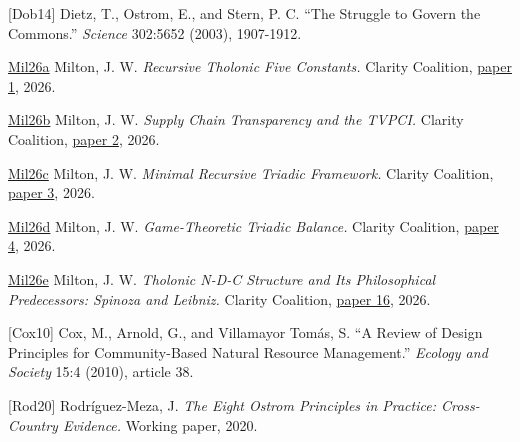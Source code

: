 \documentclass[
  11pt,
  letterpaper,
]{article}
\begin{document}
{[}Dob14{]} Dietz, T., Ostrom, E., and Stern, P. C. ``The Struggle to
Govern the Commons.'' \emph{Science} 302:5652 (2003), 1907-1912.

\href{https://github.com/baardev/truevalue/blob/main/docnav/Research/papers/1_recursive-tholonic-five-constants/1_recursive-tholonic-five-constants.pdf}{Mil26a}
Milton, J. W. \emph{Recursive Tholonic Five Constants.} Clarity
Coalition,
\href{https://github.com/baardev/truevalue/blob/main/docnav/Research/papers/1_recursive-tholonic-five-constants/1_recursive-tholonic-five-constants.pdf}{paper
1}, 2026.

\href{https://github.com/baardev/truevalue/blob/main/docnav/Research/papers/2_supply-chain-transparency-tvpci/2_supply-chain-transparency-tvpci.pdf}{Mil26b}
Milton, J. W. \emph{Supply Chain Transparency and the TVPCI.} Clarity
Coalition,
\href{https://github.com/baardev/truevalue/blob/main/docnav/Research/papers/2_supply-chain-transparency-tvpci/2_supply-chain-transparency-tvpci.pdf}{paper
2}, 2026.

\href{https://github.com/baardev/truevalue/blob/main/docnav/Research/papers/3_minimal-recursive-triadic-framework/3_minimal-recursive-triadic-framework.pdf}{Mil26c}
Milton, J. W. \emph{Minimal Recursive Triadic Framework.} Clarity
Coalition,
\href{https://github.com/baardev/truevalue/blob/main/docnav/Research/papers/3_minimal-recursive-triadic-framework/3_minimal-recursive-triadic-framework.pdf}{paper
3}, 2026.

\href{https://github.com/baardev/truevalue/blob/main/docnav/Research/papers/4_game-theoretic-triadic-balance/4_game-theoretic-triadic-balance.pdf}{Mil26d}
Milton, J. W. \emph{Game-Theoretic Triadic Balance.} Clarity Coalition,
\href{https://github.com/baardev/truevalue/blob/main/docnav/Research/papers/4_game-theoretic-triadic-balance/4_game-theoretic-triadic-balance.pdf}{paper
4}, 2026.

\href{https://github.com/baardev/truevalue/blob/main/docnav/Research/papers/16_tholonic-spinoza-leibniz/16_tholonic-spinoza-leibniz.pdf}{Mil26e}
Milton, J. W. \emph{Tholonic N-D-C Structure and Its Philosophical
Predecessors: Spinoza and Leibniz.} Clarity Coalition,
\href{https://github.com/baardev/truevalue/blob/main/docnav/Research/papers/16_tholonic-spinoza-leibniz/16_tholonic-spinoza-leibniz.pdf}{paper
16}, 2026.

{[}Cox10{]} Cox, M., Arnold, G., and Villamayor Tomás, S. ``A Review of
Design Principles for Community-Based Natural Resource Management.''
\emph{Ecology and Society} 15:4 (2010), article 38.

{[}Rod20{]} Rodríguez-Meza, J. \emph{The Eight Ostrom Principles in
Practice: Cross-Country Evidence.} Working paper, 2020.
\end{document}
